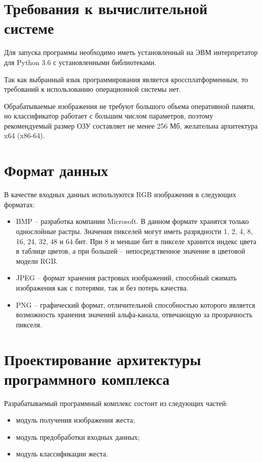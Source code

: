 \section{Требования к вычислительной системе}

Для запуска программы необходимо иметь установленный на ЭВМ интерпретатор для Python 3.6 с установленными библиотеками. 

Так как выбранный язык программирования является кроссплатформенным, то требований к использованию операционной системы нет.

Обрабатываемые изображения не требуют большого объема оперативной памяти, но классификатор работает с большим числом параметров, поэтому рекомендуемый размер ОЗУ составляет не менее 256 Мб, желательна архитектура x64 (x86-64).

\section{Формат данных}

В качестве входных данных используются RGB изображения в следующих форматах:

\begin{itemize}
	\item BMP -- разработка компании Microsoft. В данном формате хранятся только однослойные растры. Значения пикселей могут иметь разрядности 1, 2, 4, 8, 16, 24, 32, 48 и 64 бит. При 8 и меньше бит в пикселе хранится индекс цвета в таблице цветов, а при большей -- непосредственное значение в цветовой модели RGB.
	\item JPEG -- формат хранения растровых изображений, способный сжимать изображения как с потерями, так и без потерь качества. 
	\item PNG -- графический формат, отличительной способностью которого является возможность хранения значений альфа-канала, отвечающую за прозрачность пикселя.
\end{itemize}

\section{Проектирование архитектуры программного комплекса}

Разрабатываемый программный комплекс состоит из следующих частей:

\begin{itemize}
	\item модуль получения изображения жеста;
	\item модуль предобработки входных данных;
	\item модуль классификации жеста.
\end{itemize}

